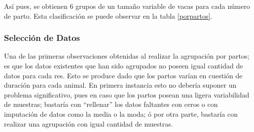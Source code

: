 \begin{table}[H]
\centering
\caption{Código de colores por número de parto}
\label{colorpartos}
\end{table}

Así pues, se obtienen 6 grupos de un tamaño variable de vacas para cada número de parto. Esta clasificación se puede observar en la tabla \ref{porpartos}. %

\subsubsection{Selección de Datos}

Una de las primeras observaciones obtenidas al realizar la agrupación por partos; es que los datos existentes que han sido agrupados no poseen igual cantidad de datos para cada res. Esto se produce dado que los partos varían en cuestión de duración para cada animal. En primera instancia esto no debería suponer un problema significativo, pues en caso que los partos posean una ligera variabilidad de muestras; bastaría con ``rellenar'' los datos faltantes con ceros o con imputación de datos como la media o la moda; ó por otra parte, bastaría con realizar una agrupación con igual cantidad de muestras.\\

